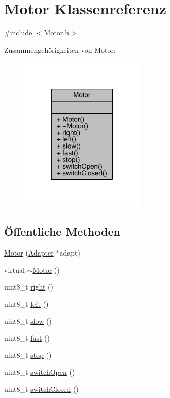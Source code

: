 \hypertarget{class_motor}{}\section{Motor Klassenreferenz}
\label{class_motor}


{\ttfamily \#include $<$Motor.\+h$>$}



Zusammengehörigkeiten von Motor\+:
\nopagebreak
\begin{figure}[H]
\begin{center}
\leavevmode
\includegraphics[width=170pt]{class_motor__coll__graph}
\end{center}
\end{figure}
\subsection*{Öffentliche Methoden}
\begin{DoxyCompactItemize}
\item 
\hyperlink{class_motor_a9150fc4647f7588364cb75dca1df4c96}{Motor} (\hyperlink{class_adapter}{Adapter} $\ast$adapt)
\item 
virtual \hyperlink{class_motor_a2e57c7b2681efea1d3b7f253ee88ecd4}{$\sim$\+Motor} ()
\item 
uint8\+\_\+t \hyperlink{class_motor_a517e585f6a9a335347f9a1230d2fc0e1}{right} ()
\item 
uint8\+\_\+t \hyperlink{class_motor_ae8af72c3a398bb959090d0be1083f5d7}{left} ()
\item 
uint8\+\_\+t \hyperlink{class_motor_a960a19729dc479265b1e5fea243de4c0}{slow} ()
\item 
uint8\+\_\+t \hyperlink{class_motor_a09b1a5376d1ea0eb39dff2ebcc325bde}{fast} ()
\item 
uint8\+\_\+t \hyperlink{class_motor_aab732159d4adf537bbcd3bcf9371d03b}{stop} ()
\item 
uint8\+\_\+t \hyperlink{class_motor_a35c0d7c6350b9f670dc243d31ea40263}{switch\+Open} ()
\item 
uint8\+\_\+t \hyperlink{class_motor_a38af68cbad8be09b85afc86f156f0f89}{switch\+Closed} ()
\end{DoxyCompactItemize}


